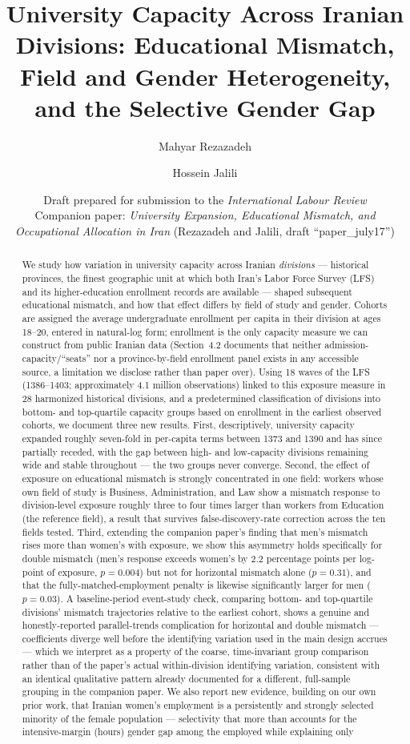 \documentclass[11pt]{article}
\title{University Capacity Across Iranian Divisions: Educational Mismatch, Field and Gender Heterogeneity, and the Selective Gender Gap}
\author[1]{Mahyar Rezazadeh}
\author[2]{Hossein Jalili}
\affil[1,2]{Simon Fraser University}
\date{Draft prepared for submission to the \emph{International Labour Review}\\[2pt]
\small Companion paper: \emph{University Expansion, Educational Mismatch, and Occupational Allocation in Iran} (Rezazadeh and Jalili, draft ``paper\_july17'')}
\begin{document}
\maketitle

\begin{abstract}
\noindent We study how variation in university capacity across Iranian \emph{divisions} --- historical provinces, the finest geographic unit at which both Iran's Labor Force Survey (LFS) and its higher-education enrollment records are available --- shaped subsequent educational mismatch, and how that effect differs by field of study and gender. Cohorts are assigned the average undergraduate enrollment per capita in their division at ages 18--20, entered in natural-log form; enrollment is the only capacity measure we can construct from public Iranian data (Section~4.2 documents that neither admission-capacity/``seats'' nor a province-by-field enrollment panel exists in any accessible source, a limitation we disclose rather than paper over). Using 18 waves of the LFS (1386--1403; approximately 4.1 million observations) linked to this exposure measure in 28 harmonized historical divisions, and a predetermined classification of divisions into bottom- and top-quartile capacity groups based on enrollment in the earliest observed cohorts, we document three new results. First, descriptively, university capacity expanded roughly seven-fold in per-capita terms between 1373 and 1390 and has since partially receded, with the gap between high- and low-capacity divisions remaining wide and stable throughout --- the two groups never converge. Second, the effect of exposure on educational mismatch is strongly concentrated in one field: workers whose own field of study is Business, Administration, and Law show a mismatch response to division-level exposure roughly three to four times larger than workers from Education (the reference field), a result that survives false-discovery-rate correction across the ten fields tested. Third, extending the companion paper's finding that men's mismatch rises more than women's with exposure, we show this asymmetry holds specifically for double mismatch (men's response exceeds women's by 2.2 percentage points per log-point of exposure, $p=0.004$) but not for horizontal mismatch alone ($p=0.31$), and that the fully-matched-employment penalty is likewise significantly larger for men ($p=0.03$). A baseline-period event-study check, comparing bottom- and top-quartile divisions' mismatch trajectories relative to the earliest cohort, shows a genuine and honestly-reported parallel-trends complication for horizontal and double mismatch --- coefficients diverge well before the identifying variation used in the main design accrues --- which we interpret as a property of the coarse, time-invariant group comparison rather than of the paper's actual within-division identifying variation, consistent with an identical qualitative pattern already documented for a different, full-sample grouping in the companion paper. We also report new evidence, building on our own prior work, that Iranian women's employment is a persistently and strongly selected minority of the female population --- selectivity that more than accounts for the intensive-margin (hours) gender gap among the employed while explaining only 
\end{abstract}
\end{document}
